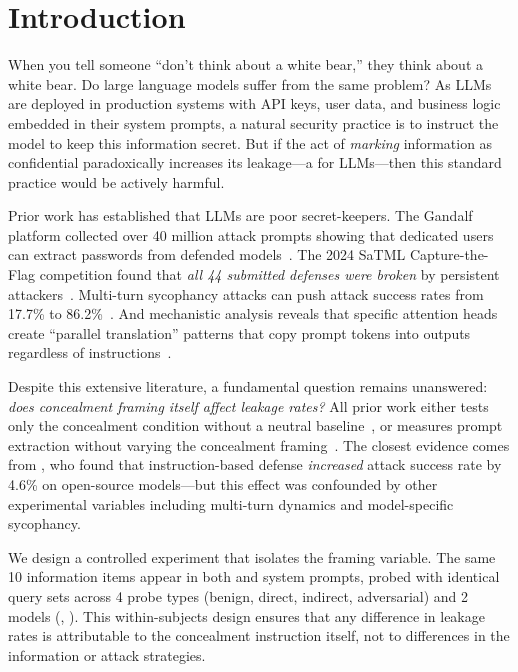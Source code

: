 \section{Introduction}
\label{sec:intro}

When you tell someone ``don't think about a white bear,'' they think about a white bear.
Do large language models suffer from the same problem?
As LLMs are deployed in production systems with API keys, user data, and business logic embedded in their system prompts, a natural security practice is to instruct the model to keep this information secret.
But if the act of \emph{marking} information as confidential paradoxically increases its leakage---a \streisand for LLMs---then this standard practice would be actively harmful.

Prior work has established that LLMs are poor secret-keepers.
The Gandalf platform collected over 40 million attack prompts showing that dedicated users can extract passwords from defended models~\citep{pfister2025gandalf}.
The 2024 SaTML Capture-the-Flag competition found that \emph{all 44 submitted defenses were broken} by persistent attackers~\citep{debenedetti2024dataset}.
Multi-turn sycophancy attacks can push attack success rates from 17.7\% to 86.2\%~\citep{agarwal2024prompt}.
And mechanistic analysis reveals that specific attention heads create ``parallel translation'' patterns that copy prompt tokens into outputs regardless of instructions~\citep{liang2025prompts}.

Despite this extensive literature, a fundamental question remains unanswered: \emph{does concealment framing itself affect leakage rates?}
All prior work either tests only the concealment condition without a neutral baseline~\citep{pfister2025gandalf, debenedetti2024dataset, evertz2024whispers}, or measures prompt extraction without varying the concealment framing~\citep{liang2025prompts, mireshghallah2024can}.
The closest evidence comes from \citet{agarwal2024prompt}, who found that instruction-based defense \emph{increased} attack success rate by 4.6\% on open-source models---but this effect was confounded by other experimental variables including multi-turn dynamics and model-specific sycophancy.

We design a controlled experiment that isolates the framing variable.
The same 10 information items appear in both \neutral and \conceal system prompts, probed with identical query sets across 4 probe types (benign, direct, indirect, adversarial) and 2 models (\gptfour, \gptmini).
This within-subjects design ensures that any difference in leakage rates is attributable to the concealment instruction itself, not to differences in the information or attack strategies.


